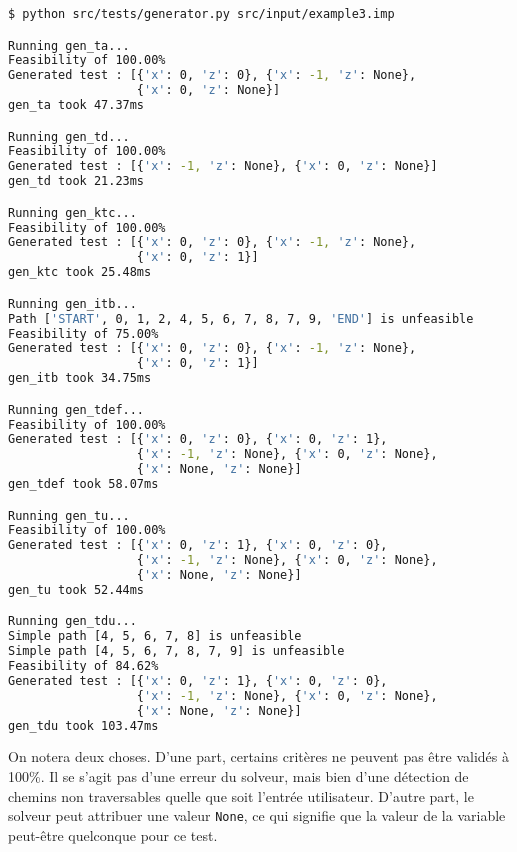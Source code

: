 \begin{lstlisting}[language=bash]
$ python src/tests/generator.py src/input/example3.imp

Running gen_ta...
Feasibility of 100.00%
Generated test : [{'x': 0, 'z': 0}, {'x': -1, 'z': None},
                  {'x': 0, 'z': None}]
gen_ta took 47.37ms

Running gen_td...
Feasibility of 100.00%
Generated test : [{'x': -1, 'z': None}, {'x': 0, 'z': None}]
gen_td took 21.23ms

Running gen_ktc...
Feasibility of 100.00%
Generated test : [{'x': 0, 'z': 0}, {'x': -1, 'z': None},
                  {'x': 0, 'z': 1}]
gen_ktc took 25.48ms

Running gen_itb...
Path ['START', 0, 1, 2, 4, 5, 6, 7, 8, 7, 9, 'END'] is unfeasible
Feasibility of 75.00%
Generated test : [{'x': 0, 'z': 0}, {'x': -1, 'z': None},
                  {'x': 0, 'z': 1}]
gen_itb took 34.75ms

Running gen_tdef...
Feasibility of 100.00%
Generated test : [{'x': 0, 'z': 0}, {'x': 0, 'z': 1},
                  {'x': -1, 'z': None}, {'x': 0, 'z': None},
                  {'x': None, 'z': None}]
gen_tdef took 58.07ms

Running gen_tu...
Feasibility of 100.00%
Generated test : [{'x': 0, 'z': 1}, {'x': 0, 'z': 0},
                  {'x': -1, 'z': None}, {'x': 0, 'z': None},
                  {'x': None, 'z': None}]
gen_tu took 52.44ms

Running gen_tdu...
Simple path [4, 5, 6, 7, 8] is unfeasible
Simple path [4, 5, 6, 7, 8, 7, 9] is unfeasible
Feasibility of 84.62%
Generated test : [{'x': 0, 'z': 1}, {'x': 0, 'z': 0},
                  {'x': -1, 'z': None}, {'x': 0, 'z': None},
                  {'x': None, 'z': None}]
gen_tdu took 103.47ms
\end{lstlisting}

\bigskip

On notera deux choses. D'une part, certains critères ne peuvent pas être
validés à 100\%. Il se s'agit pas d'une erreur du solveur, mais bien d'une
détection de chemins non traversables quelle que soit l'entrée utilisateur.
D'autre part, le solveur peut attribuer une valeur \texttt{None}, ce qui
signifie que la valeur de la variable peut-être quelconque pour ce test.
